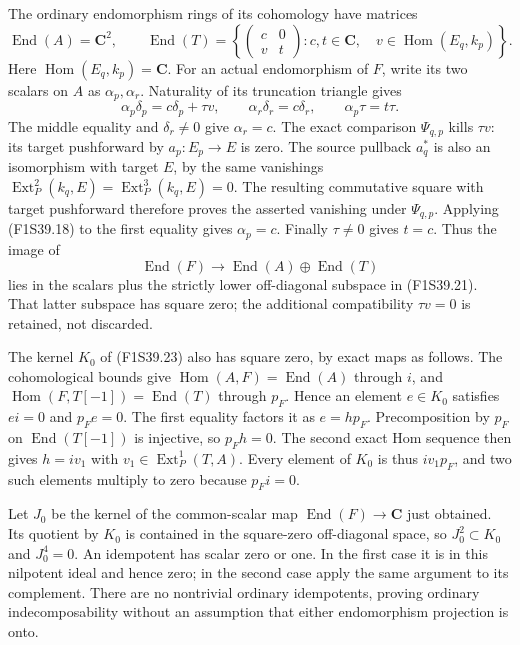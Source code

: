 The ordinary endomorphism rings of its
cohomology have matrices
\[
 \operatorname{End}(A)=\mathbf C^2,
 \qquad
 \operatorname{End}(T)=
  \left\{\begin{pmatrix}c&0\\v&t\end{pmatrix}:
        c,t\in\mathbf C,\quad
        v\in\operatorname{Hom}(E_q,k_p)\right\}.
 \tag{F1S39.21}
\]
Here $\operatorname{Hom}(E_q,k_p)=\mathbf C$.
For an actual endomorphism of $F$, write its
two scalars on $A$ as $\alpha_p,\alpha_r$.
Naturality of its truncation triangle gives
\[
 \alpha_p\delta_p=c\delta_p+\tau v,
 \qquad \alpha_r\delta_r=c\delta_r,
 \qquad \alpha_p\tau=t\tau.
 \tag{F1S39.22}
\]
The middle equality and $\delta_r\ne0$
give $\alpha_r=c$. The exact comparison
$\Psi_{q,p}$ kills $\tau v$: its target
pushforward by $a_p:E_p\to E$ is zero.
The source pullback $a_q^*$ is also an
isomorphism with target $E$, by the same
vanishings $\operatorname{Ext}^2_P(k_q,E)
=\operatorname{Ext}^3_P(k_q,E)=0$.
The resulting commutative square with target
pushforward therefore proves the asserted
vanishing under $\Psi_{q,p}$.
Applying (F1S39.18) to the first equality
gives $\alpha_p=c$.
Finally $\tau\ne0$ gives $t=c$.
Thus the image of
\[
 \operatorname{End}(F)\longrightarrow
                 \operatorname{End}(A)\oplus\operatorname{End}(T)
 \tag{F1S39.23}
\]
lies in the scalars plus the strictly lower
off-diagonal subspace in (F1S39.21).
That latter subspace has square zero; the
additional compatibility $\tau v=0$ is
retained, not discarded.

The kernel $K_0$ of (F1S39.23) also has
square zero, by exact maps as follows.
The cohomological bounds give
$\operatorname{Hom}(A,F)=\operatorname{End}(A)$
through $i$, and
$\operatorname{Hom}(F,T[-1])=\operatorname{End}(T)$
through $p_F$. Hence an element $e\in K_0$
satisfies $ei=0$ and $p_Fe=0$.
The first equality factors it as $e=h p_F$.
Precomposition by $p_F$ on
$\operatorname{End}(T[-1])$ is injective,
so $p_Fh=0$. The second exact Hom sequence
then gives $h=i v_1$ with
$v_1\in\operatorname{Ext}^1_P(T,A)$.
Every element of $K_0$ is thus $i v_1p_F$,
and two such elements multiply to zero
because $p_Fi=0$.

Let $J_0$ be the kernel of the common-scalar
map $\operatorname{End}(F)\to\mathbf C$
just obtained. Its quotient by $K_0$ is
contained in the square-zero off-diagonal
space, so $J_0^2\subset K_0$ and
$J_0^4=0$. An idempotent has scalar zero
or one. In the first case it is in this
nilpotent ideal and hence zero; in the
second case apply the same argument to
its complement. There are no nontrivial
ordinary idempotents, proving ordinary
indecomposability without an assumption
that either endomorphism projection is onto.

